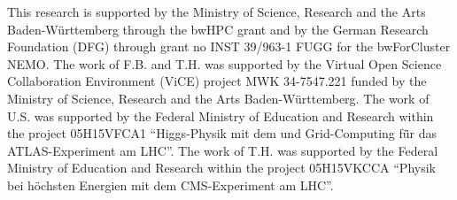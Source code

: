 \begin{acknowledgements}
This research is supported by the Ministry of Science, Research and the Arts Baden-W\"urttemberg through the bwHPC grant
and by the German Research Foundation (DFG) through grant no INST
39/963-1 FUGG for the bwForCluster NEMO.
The work of F.B. and T.H. was supported by the Virtual Open Science
Collaboration Environment (ViCE) project MWK 34-7547.221 funded by the
Ministry of Science, Research and the Arts Baden-W\"urttemberg.
The work of U.S. was supported by  the Federal Ministry of Education
and Research within the project 05H15VFCA1
``Higgs-Physik mit dem und Grid-Computing f\"ür das ATLAS-Experiment
am LHC''.
The work of T.H. was supported by the Federal Ministry of Education
and Research within the project 05H15VKCCA ``Physik bei h\"ochsten Energien mit dem CMS-Experiment
    am LHC''.
\end{acknowledgements}


